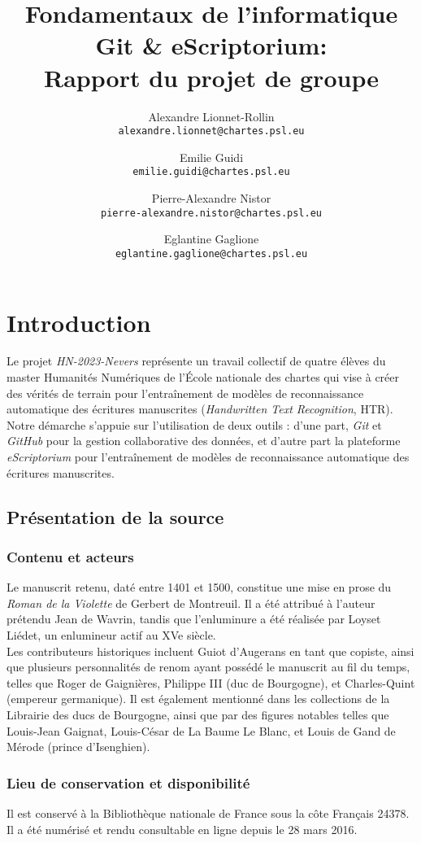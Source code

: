 \documentclass[12pt,a4paper,oneside,titlepage]{article} %
\author{Alexandre Lionnet-Rollin\\
	\texttt{alexandre.lionnet@chartes.psl.eu}\and Emilie Guidi\\
	\texttt{emilie.guidi@chartes.psl.eu}
	\and Pierre-Alexandre Nistor\\
	\texttt{pierre-alexandre.nistor@chartes.psl.eu}\and 
Eglantine Gaglione\\
	\texttt{eglantine.gaglione@chartes.psl.eu}}
\title{Fondamentaux de l'informatique Git \& eScriptorium: \\
	Rapport du projet de groupe}
\begin{document}
	\maketitle
	

\section{Introduction}
Le projet \emph{HN-2023-Nevers} représente un travail collectif de quatre élèves du master Humanités Numériques de l'École nationale des chartes qui vise à créer des vérités de terrain pour l'entraînement de modèles de reconnaissance automatique des écritures manuscrites (\emph{Handwritten Text Recognition}, HTR). Notre démarche s'appuie sur l'utilisation de deux outils : d'une part, \emph{Git} et \emph{GitHub} pour la gestion collaborative des données, et d'autre part la plateforme \emph{eScriptorium} pour l'entraînement de modèles de reconnaissance automatique des écritures manuscrites.
\subsection{Présentation de la source }
\subsubsection{ Contenu et acteurs}
Le manuscrit retenu, daté entre 1401 et 1500, constitue une mise en prose du \emph{Roman de la Violette} de Gerbert de Montreuil. Il a été attribué à l'auteur prétendu Jean de Wavrin, tandis que l'enluminure a été réalisée par Loyset Liédet, un enlumineur actif au XVe siècle. \\
Les contributeurs historiques incluent Guiot d'Augerans en tant que copiste, ainsi que plusieurs personnalités de renom ayant possédé le manuscrit au fil du temps, telles que Roger de Gaignières, Philippe III (duc de Bourgogne), et Charles-Quint (empereur germanique). Il est également mentionné dans les collections de la Librairie des ducs de Bourgogne, ainsi que par des figures notables telles que Louis-Jean Gaignat, Louis-César de La Baume Le Blanc, et Louis de Gand de Mérode (prince d'Isenghien).
\subsubsection{ Lieu de conservation et disponibilité}
Il est conservé à la Bibliothèque nationale de France sous la côte Français 24378.  Il a été numérisé et rendu consultable en ligne depuis le 28 mars 2016. 
\end{document}
